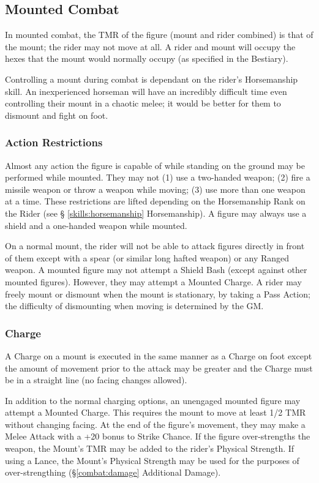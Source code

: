 \begin{multicols*}{3}
\subsection{Mounted Combat}

In mounted combat, the TMR of the figure (mount and rider combined) is
that of the mount; the rider may not move at all. A rider and mount
will occupy the hexes that the mount would normally occupy (as
specified in the Bestiary).

Controlling a mount during combat is dependant on the rider's
Horsemanship skill. An inexperienced horseman will have an incredibly
difficult time even controlling their mount in a chaotic melee; it
would be better for them to dismount and fight on foot.

\subsubsection{Action Restrictions}

Almost any action the figure is capable of while standing on the
ground may be performed while mounted. They may not (1) use a
two-handed weapon; (2) fire a missile weapon or throw a weapon while
moving; (3) use more than one weapon at a time. These restrictions are
lifted depending on the Horsemanship Rank on the Rider (see \S
\ref{skills:horsemanship} Horsemanship). A figure may always use a shield and
a one-handed weapon while mounted.

On a normal mount, the rider will not be able to attack figures
directly in front of them except with a spear (or similar long hafted
weapon) or any Ranged weapon. A mounted figure may not attempt a
Shield Bash (except against other mounted figures). However, they may
attempt a Mounted Charge. A rider may freely mount or dismount when
the mount is stationary, by taking a Pass Action; the difficulty of
dismounting when moving is determined by the GM.

\subsubsection{Charge}

A Charge on a mount is executed in the same manner as a Charge on foot
except the amount of movement prior to the attack may be greater and
the Charge must be in a straight line (no facing changes allowed).

In addition to the normal charging options, an unengaged mounted
figure may attempt a Mounted Charge. This requires the mount to move
at least 1/2 TMR without changing facing. At the end of the figure's
movement, they may make a Melee Attack with a +20 bonus to Strike
Chance. If the figure over-strengths the weapon, the Mount's TMR may
be added to the rider's Physical Strength. If using a Lance, the
Mount's Physical Strength may be used for the purposes of
over-strengthing (\S\ref{combat:damage} Additional Damage).


\end{multicols*}
